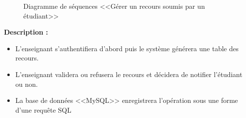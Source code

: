 \documentclass[12pt]{report}
\begin{document}
\begin{figure}[h]
\centering
    \centerline{}
    \caption{Diagramme de séquences <<Gérer un recours soumis par un étudiant>>}
\end{figure}

\textbf{Description :}

\begin{itemize}
    \item L'enseignant s'authentifiera d'abord puis le système générera une table des recours.
    \item L'enseignant validera ou refusera le recours et décidera de notifier l'étudiant ou non.
    \item La base de données <<MySQL>> enregistrera l'opération sous une forme d'une requête SQL
\end{itemize}
\end{document}
